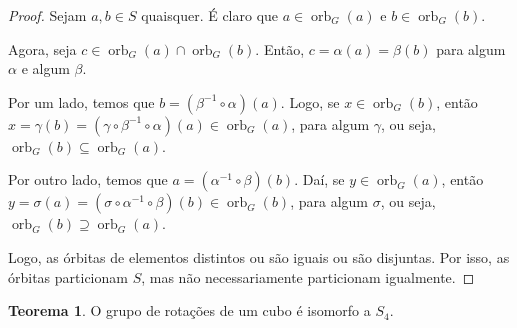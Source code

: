 \documentclass[a4paper,portuguese,11pt,twoside, leqno]{book}
\DeclareMathOperator{\orb}{orb}
\theoremstyle{definition}
\newtheorem{theorem}{Teorema}[section]
\begin{document}
	\begin{proof}
		Sejam $a,b\in S$ quaisquer. É claro que $a\in\orb_G(a)$ e $b\in\orb_G(b)$. 
		\par\vspace{0.3cm} Agora, seja $c\in\orb_G(a)\cap\orb_G(b)$. Então, $c = \alpha(a) = \beta(b)$ para algum $\alpha$ e algum $\beta$.
		\par\vspace{0.3cm} Por um lado, temos que $b = (\beta^{-1}\circ\alpha)(a)$. Logo, se $x\in\orb_G(b)$, então $x = \gamma(b) = (\gamma\circ\beta^{-1}\circ\alpha)(a)\in\orb_G(a)$, para algum $\gamma$, ou seja, $\orb_G(b)\subseteq\orb_G(a)$.
		\par\vspace{0.3cm} Por outro lado, temos que $a = (\alpha^{-1}\circ\beta)(b)$. Daí, se $y\in\orb_G(a)$, então $y = \sigma(a) = (\sigma\circ\alpha^{-1}\circ\beta)(b)\in\orb_G(b)$, para algum $\sigma$, ou seja, $\orb_G(b)\supseteq\orb_G(a)$. 
		\par\vspace{0.3cm} Logo, as órbitas de elementos distintos ou são iguais ou são disjuntas. Por isso, as órbitas particionam $S$, mas não necessariamente particionam igualmente.  
		
	\end{proof}
	
	
	
	\begin{theorem}
		\label{rotacoes iso a S_4}
		O grupo de rotações de um cubo é isomorfo a $S_4$.
	\end{theorem}
	
\end{document}
